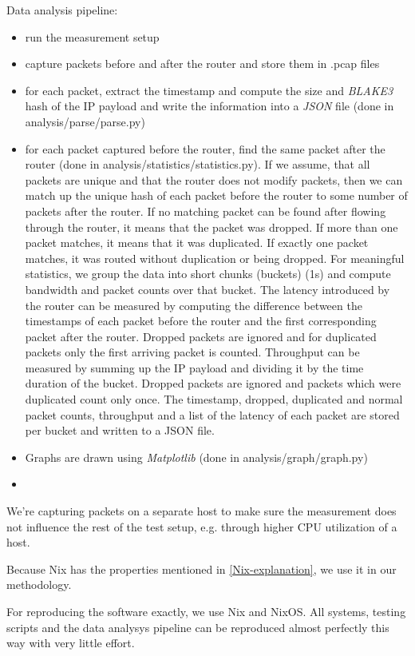 Data analysis pipeline:
\begin{itemize}
  \item run the measurement setup
  \item capture packets before and after the router and store them in .pcap files
  \item for each packet, extract the timestamp and compute the size and \textit{BLAKE3} \cite{wiki:BLAKE3} hash of the IP payload and write the information into a \textit{JSON} \cite{wiki:JSON} file (done in analysis/parse/parse.py)
  \item for each packet captured before the router, find the same packet after the router (done in analysis/statistics/statistics.py). If we assume, that all packets are unique and that the router does not modify packets, then we can match up the unique hash of each packet before the router to some number of packets after the router. If no matching packet can be found after flowing through the router, it means that the packet was dropped. If more than one packet matches, it means that it was duplicated. If exactly one packet matches, it was routed without duplication or being dropped. For meaningful statistics, we group the data into short chunks (buckets) (1s) and compute bandwidth and packet counts over that bucket. The latency introduced by the router can be measured by computing the difference between the timestamps of each packet before the router and the first corresponding packet after the router. Dropped packets are ignored and for duplicated packets only the first arriving packet is counted. Throughput can be measured by summing up the IP payload  and dividing it by the time duration of the bucket. Dropped packets are ignored and packets which were duplicated count only once. The timestamp, dropped, duplicated and normal packet counts, throughput and a list of the latency of each packet are stored per bucket and written to a JSON file.
  \item Graphs are drawn using \textit{Matplotlib} \cite{Matplotlib} (done in analysis/graph/graph.py)
  \item {}
\end{itemize}


We're capturing packets on a separate host to make sure the measurement does not influence the rest of the test setup, e.g. through higher CPU utilization of a host.


Because Nix has the properties mentioned in \ref{Nix-explanation}, we use it in our methodology.


For reproducing the software exactly, we use Nix and NixOS.
All systems, testing scripts and the data analysys pipeline can be reproduced almost perfectly this way with very little effort.



\cite{RFC7858}